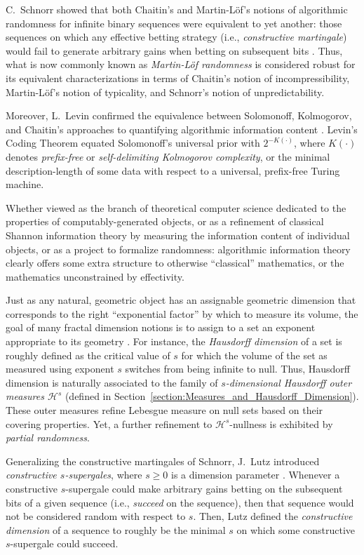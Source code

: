 C.~Schnorr showed that both Chaitin's and Martin-L{\"o}f's notions of algorithmic randomness for infinite binary sequences were equivalent to yet another: those sequences on which any effective betting strategy (i.e., \textit{constructive martingale}) would fail to generate arbitrary gains when betting on subsequent bits \cite{Sch71}. Thus, what is now commonly known as \textit{Martin-L{\"o}f randomness} is considered robust for its equivalent characterizations in terms of Chaitin's notion of incompressibility, Martin-L{\"o}f's notion of typicality, and Schnorr's notion of unpredictability.

Moreover, L.~Levin confirmed the equivalence between Solomonoff, Kolmogorov, and Chaitin's approaches to quantifying algorithmic information content \cite{Lev73}. Levin's Coding Theorem equated Solomonoff's universal prior with $2^{-K(\cdot)}$, where $K(\cdot)$ denotes \textit{prefix-free} or \textit{self-delimiting Kolmogorov complexity}, or the minimal description-length of some data with respect to a universal, prefix-free Turing machine.

Whether viewed as the branch of theoretical computer science dedicated to the properties of computably-generated objects, or as a refinement of classical Shannon information theory by measuring the information content of individual objects, or as a project to formalize randomness: algorithmic information theory clearly offers some extra structure to otherwise ``classical'' mathematics, or the mathematics unconstrained by effectivity. 

Just as any natural, geometric object has an assignable geometric dimension that corresponds to the right ``exponential factor'' by which to measure its volume, the goal of many fractal dimension notions is to assign to a set an exponent appropriate to its geometry \cite{DMR05}. For instance, the \textit{Hausdorff dimension} of a set is roughly defined as the critical value of $s$ for which the volume of the set as measured using exponent $s$ switches from being infinite to null. Thus, Hausdorff dimension is naturally associated to the family of \textit{$s$-dimensional Hausdorff outer measures $\mathcal{H}^s$} (defined in Section~\ref{section:Measures_and_Hausdorff_Dimension}). These outer measures refine Lebesgue measure on null sets based on their covering properties. Yet, a further refinement to $\mathcal{H}^s$-nullness is exhibited by \textit{partial randomness}.

Generalizing the constructive martingales of Schnorr, J.~Lutz introduced \textit{constructive $s$-supergales}, where $s \geq 0$ is a dimension parameter \cite{Lut00}. Whenever a constructive $s$-supergale could make arbitrary gains betting on the subsequent bits of a given sequence (i.e., \textit{succeed} on the sequence), then that sequence would not be considered random with respect to $s$. Then, Lutz defined the \textit{constructive dimension} of a sequence to roughly be the minimal $s$ on which some constructive $s$-supergale could succeed. 

